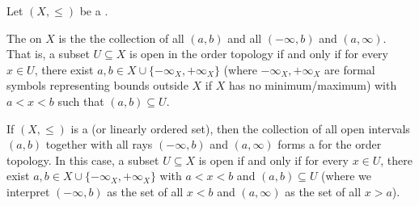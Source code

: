 \begin{definition} \label{definition:order_topology_on_a_partially_ordered_set}
    Let $(X, \leq)$ be a .

    The  on $X$ is the   the collection of all  $(a, b)$ and all  $(-\infty, b)$ and $(a, \infty)$. That is, a subset $U \subseteq X$ is open in the order topology if and only if for every $x \in U$, there exist $a, b \in X \cup \{-\infty_X, +\infty_X\}$ (where $-\infty_X, +\infty_X$ are formal symbols representing bounds outside $X$ if $X$ has no minimum/maximum) with $a < x < b$ such that $(a, b) \subseteq U$.

    If $(X, \leq)$ is a  (or linearly ordered set), then the collection of all open intervals $(a, b)$ together with all rays $(-\infty, b)$ and $(a, \infty)$ forms a  for the order topology. In this case, a subset $U \subseteq X$ is open if and only if for every $x \in U$, there exist $a, b \in X \cup \{-\infty_X, +\infty_X\}$ with $a < x < b$ and $(a, b) \subseteq U$ (where we interpret $(-\infty, b)$ as the set of all $x < b$ and $(a, \infty)$ as the set of all $x > a$).
\end{definition}
